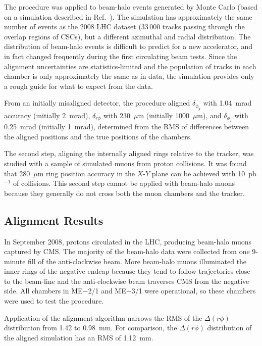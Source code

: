 The procedure was applied to beam-halo events generated by Monte Carlo
(based on a simulation described in Ref.~\cite{CMS_NOTE_2005-012}).  The
simulation has approximately the same number of events as the 2008 LHC
dataset (33$\,$000 tracks passing through the overlap regions of
CSCs), but a different azimuthal and radial distribution.  The
distribution of beam-halo events is difficult to predict for a new
accelerator, and in fact changed frequently during the first
circulating beam tests.  Since the alignment uncertainties are
statistics-limited and the population of tracks in each chamber is
only approximately the same as in data, the simulation provides only a
rough guide for what to expect from the data.

From an initially misaligned detector, the procedure aligned
$\delta_{\phi_y}$ with 1.04~mrad accuracy (initially 2~mrad), $\delta_{r\phi}$ with
230~$\mu$m (initially 1000~$\mu$m), and $\delta_{\phi_z}$ with
0.25~mrad (initially 1~mrad), determined from the
RMS of differences between the aligned positions and the true
positions of the chambers.

The second step, aligning the internally aligned rings relative to the
tracker, was studied with a sample of simulated muons from proton
collisions.  It was found that 280~$\mu$m ring position accuracy in
the $X$-$Y$ plane can be achieved with 10~pb$^{-1}$ of collisions.
This second step cannot be applied with beam-halo muons because they
generally do not cross both the muon chambers and the tracker.

\subsection{Alignment Results}

In September 2008, protons circulated in the LHC, producing beam-halo
muons captured by CMS.  The majority of the beam-halo data were
collected from one 9-minute fill of the anti-clockwise beam.  More
beam-halo muons illuminated the inner rings of the negative endcap
because they tend to follow trajectories close to the beam-line and
the anti-clockwise beam traverses CMS from the negative side.  All
chambers in ME$-$2/1 and ME$-$3/1 were operational, so these chambers
were used to test the procedure.

Application of the alignment algorithm narrows the RMS of the $\Delta
(r\phi)$ distribution from 1.42 to 0.98~mm.  For comparison, the
$\Delta (r\phi)$ distribution of the aligned simulation has an RMS of
1.12~mm.

